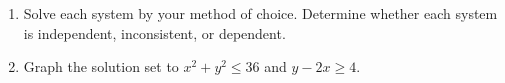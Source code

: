 \documentclass[12pt]{article}
\begin{document}
\begin{enumerate}
\eject
\item
Solve each system by your method of choice. Determine whether each system is independent, inconsistent, or dependent.

\eject
\item
Graph the solution set to $x^2 + y^2 \leq 36$ and $y - 2x \geq 4$. 

\end{enumerate}
\end{document}
